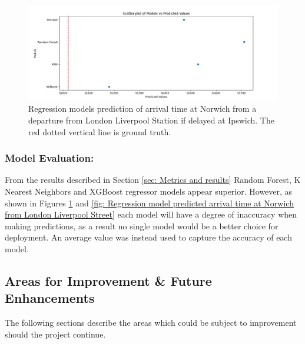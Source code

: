 \begin{figure}[!htbp]
    \centering
    \includegraphics[width=\textwidth]{../regression_model/plots/Comparison/Scatter plot of Models vs Predicted Value 55020.jpeg}
    \caption[regression model predictions of previous journeys]{Regression models prediction of arrival time at Norwich from a departure from London Liverpool Station if delayed at Ipswich. The red dotted vertical line is ground truth.}
    \label{fig: inline_Regression models prediction of arrival time at Norwich}
\end{figure}

\subsubsection{Model Evaluation:}
From the results described in Section \ref{sec: Metrics and results} Random Forest, K Nearest Neighbors and XGBoost regressor models appear superior. However, as shown in Figures \ref{fig: inline_Regression models prediction of arrival time at Norwich} and \ref{fig: Regression model predicted arrival time at Norwich from London Liverpool Street} each model will have a degree of inaccuracy when making predictions, as a result no single model would be a better choice for deployment. An average value was instead used to capture the accuracy of each model.

\subsection{Areas for Improvement \& Future Enhancements}
The following sections describe the areas which could be subject to improvement should the project continue.
